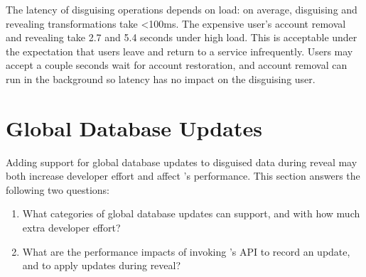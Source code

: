 %
%
%

The latency of disguising operations depends on load: on average, disguising and
revealing transformations take <100ms.  The expensive user's account removal and
revealing take 2.7 and 5.4 seconds under high load. 
%
%
%
This is acceptable under the expectation that users leave and return to a
service infrequently. Users may accept a couple seconds wait for account
restoration, and account removal can run in the background so latency has no
impact on the disguising user.  

\section{Global Database Updates}
\label{s:eval-updates}

%
Adding support for global database updates to disguised data during reveal may both
increase developer effort and affect \sys's performance.
This section answers the following two questions:
\begin{enumerate}[nosep]
    \item What categories of global database updates can \sys support, and with how
        much extra developer effort? 
    \item What are the performance impacts of invoking \sys's API to record an
        update, and to apply updates during reveal?
\end{enumerate}

